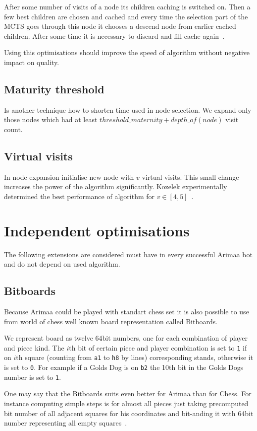 After some number of visits of a node its children caching is switched on. Then
a few best children are chosen and cached and every time the selection part of
the MCTS goes through this node it chooses a descend node from earlier cached
children. After some time it is necessary to discard and fill cache
again~\cite{KOZELEK}.

Using this optimisations should improve the speed of algorithm without negative
impact on quality.

\subsection{Maturity threshold}
Is another technique how to shorten time used in node selection. We
expand only those nodes which had at least $threshold\_maternity +
depth\_of(node)$ visit count.

\subsection{Virtual visits}
In node expansion initialise new node with $v$ virtual visits. This small
change increases the power of the algorithm significantly. Kozelek
experimentally determined the best performance of algorithm for $v \in
[4,5]$~\cite{KOZELEK}.

\section{Independent optimisations}
The following extensions are considered must have in every successful Arimaa
bot and do not depend on used algorithm.

	\subsection{Bitboards}
	Because Arimaa could be played with standart chess set it is also possible
	to use from world of chess well known board representation called
	Bitboards.

	We represent board as twelve 64bit numbers, one for each combination of
	player and piece kind. The $i$th bit of certain piece and player
	combination is set to \texttt{1} if on $i$th square (counting from
	\texttt{a1} to \texttt{h8} by lines) corresponding stands, otherwise it
	is set to \texttt{0}. For example if a Golds Dog is on \texttt{b2} the 10th
	bit in the Golds Dogs number is set to \texttt{1}.

	One may say that the Bitboards suits even better for Arimaa than for Chess.
	For instance computing simple steps is for almost all pieces just taking
	precomputed bit number of all adjacent squares for his coordinates and
	bit-anding it with 64bit number representing all empty
	squares~\cite{BitboardAnalysis}.

